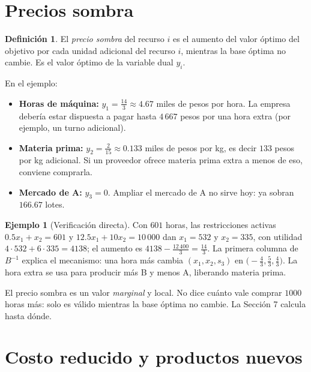 \documentclass[a4paper,11pt]{article}
\theoremstyle{plain}
\theoremstyle{definition}
\newtheorem{definicion}[teorema]{Definición}
\newtheorem{ejemplo}[teorema]{Ejemplo}
\newcommand{\fr}[2]{\tfrac{#1}{#2}}
\begin{document}
\section{Precios sombra}

\begin{definicion}
El \emph{precio sombra} del recurso $i$ es el aumento del valor óptimo del objetivo por cada unidad
adicional del recurso $i$, mientras la base óptima no cambie. Es el valor óptimo de la variable dual $y_i$.
\end{definicion}

En el ejemplo:
\begin{itemize}
\item \textbf{Horas de máquina:} $y_1=\fr{14}3\approx4.67$ miles de pesos por hora. La empresa debería estar
dispuesta a pagar hasta $4\,667$ pesos por una hora extra (por ejemplo, un turno adicional).
\item \textbf{Materia prima:} $y_2=\fr2{15}\approx0.133$ miles de pesos por kg, es decir $133$ pesos por kg
adicional. Si un proveedor ofrece materia prima extra a menos de eso, conviene comprarla.
\item \textbf{Mercado de A:} $y_3=0$. Ampliar el mercado de A no sirve hoy: ya sobran $166.67$ lotes.
\end{itemize}

\begin{ejemplo}[Verificación directa]
Con $601$ horas, las restricciones activas $0.5x_1+x_2=601$ y $12.5x_1+10x_2=10\,000$ dan
$x_1=532$ y $x_2=335$, con utilidad $4\cdot532+6\cdot335=4138$; el aumento es
$4138-\fr{12\,400}3=\fr{14}3$. La primera columna de $B^{-1}$ explica el mecanismo: una hora más cambia
$(x_1,x_2,s_3)$ en $\big(-\fr43,\fr53,\fr43\big)$. La hora extra se usa para producir más B y menos A,
liberando materia prima.
\end{ejemplo}

\begin{idea}[Cuidado]
El precio sombra es un valor \emph{marginal} y local. No dice cuánto vale comprar $1000$ horas más: solo es
válido mientras la base óptima no cambie. La Sección 7 calcula hasta dónde.
\end{idea}

\section{Costo reducido y productos nuevos}
\end{document}
